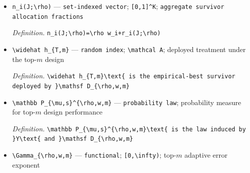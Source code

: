 \documentclass{article}
\begin{document}
\begin{itemize}
  \item \texttt{n\_\allowbreak{}i(J;\allowbreak{}\textbackslash{}\allowbreak{}rho)} --- \texttt{set-\allowbreak{}indexed vector}; \texttt{[0,\allowbreak{}1]\textasciicircum{}K}; \texttt{aggregate survivor allocation fractions}
  \par\smallskip\noindent\emph{Definition.} \texttt{n\_\allowbreak{}i(J;\allowbreak{}\textbackslash{}\allowbreak{}rho)=\allowbreak{}\textbackslash{}\allowbreak{}rho w\_\allowbreak{}i+\allowbreak{}r\_\allowbreak{}i(J;\allowbreak{}\textbackslash{}\allowbreak{}rho)}
  \item \texttt{\textbackslash{}\allowbreak{}widehat h\_\allowbreak{}\{T,\allowbreak{}m\}\allowbreak{}} --- \texttt{random index}; \texttt{\textbackslash{}\allowbreak{}mathcal A}; deployed treatment under the top-\(m\) design
  \par\smallskip\noindent\emph{Definition.} \texttt{\textbackslash{}\allowbreak{}widehat h\_\allowbreak{}\{T,\allowbreak{}m\}\allowbreak{}\textbackslash{}\allowbreak{}text\{ is the empirical-\allowbreak{}best survivor deployed by \}\allowbreak{}\textbackslash{}\allowbreak{}mathsf D\_\allowbreak{}\{\textbackslash{}\allowbreak{}rho,\allowbreak{}w,\allowbreak{}m\}\allowbreak{}}
  \item \texttt{\textbackslash{}\allowbreak{}mathbb P\_\allowbreak{}\{\textbackslash{}\allowbreak{}mu,\allowbreak{}s\}\allowbreak{}\textasciicircum{}\{\textbackslash{}\allowbreak{}rho,\allowbreak{}w,\allowbreak{}m\}\allowbreak{}} --- \texttt{probability law}; probability measure for top-\(m\) design performance
  \par\smallskip\noindent\emph{Definition.} \texttt{\textbackslash{}\allowbreak{}mathbb P\_\allowbreak{}\{\textbackslash{}\allowbreak{}mu,\allowbreak{}s\}\allowbreak{}\textasciicircum{}\{\textbackslash{}\allowbreak{}rho,\allowbreak{}w,\allowbreak{}m\}\allowbreak{}\textbackslash{}\allowbreak{}text\{ is the law induced by \}\allowbreak{}Y\textbackslash{}\allowbreak{}text\{ and \}\allowbreak{}\textbackslash{}\allowbreak{}mathsf D\_\allowbreak{}\{\textbackslash{}\allowbreak{}rho,\allowbreak{}w,\allowbreak{}m\}\allowbreak{}}
  \item \texttt{\textbackslash{}\allowbreak{}Gamma\_\allowbreak{}\{\textbackslash{}\allowbreak{}rho,\allowbreak{}w,\allowbreak{}m\}\allowbreak{}} --- \texttt{functional}; \texttt{[0,\allowbreak{}\textbackslash{}\allowbreak{}infty)}; top-\(m\) adaptive error exponent

\end{itemize}
\end{document}
